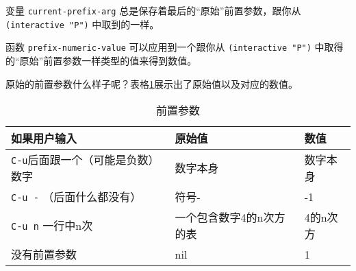 变量 \texttt{current-prefix-arg} 总是保存着最后的“原始”前置参数，跟你从 \texttt{(interactive "P")} 中取到的一样。

函数 \texttt{prefix-numeric-value} 可以应用到一个跟你从 \texttt{(interactive "P")} 中取得的“原始”前置参数一样类型的值来得到数值。

原始的前置参数什么样子呢？表格\ref{table:prefix-arguments}展示出了原始值以及对应的数值。

\begin{table}[hbt!]
  \begin{tabular}{l|l|l}
    如果用户输入 & 原始值 & 数值 \\
    \hline
    \verb|C-u|后面跟一个（可能是负数）数字 & 数字本身 & 数字本身 \\
    \verb|C-u -| （后面什么都没有） & 符号- & -1 \\
    \verb|C-u n| 一行中n次 & 一个包含数字4的n次方的表 & 4的n次方 \\
    没有前置参数 & nil & 1 \\
    \hline
  \end{tabular}
  \caption{前置参数}
  \label{table:prefix-arguments}
\end{table}
